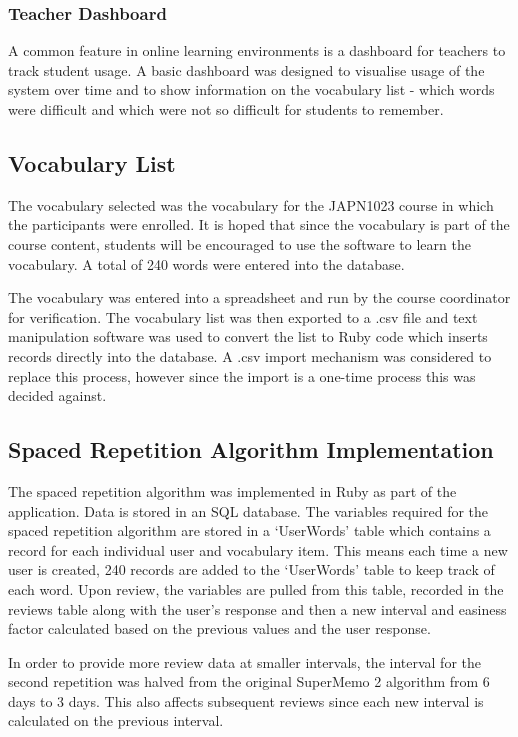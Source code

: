 \subsubsection{Teacher Dashboard}
A common feature in online learning environments is a dashboard for teachers to track
student usage. A basic dashboard was designed to visualise usage of the system
over time and to show information on the vocabulary list - which words were difficult
and which were not so difficult for students to remember.

\subsection{Vocabulary List}
The vocabulary selected was the vocabulary for the JAPN1023 course in which the participants
were enrolled. It is hoped that since the vocabulary is part of the course content, students
will be encouraged to use the software to learn the vocabulary. A total of 240 words were
entered into the database. 

The vocabulary was entered into a spreadsheet and run by the course coordinator for verification.
The vocabulary list was then exported to a .csv file and text manipulation software
was used to convert the list to Ruby code which inserts records directly into the
database. A .csv import mechanism was considered to replace this process, however
since the import is a one-time process this was decided against.  

\subsection{Spaced Repetition Algorithm Implementation}
The spaced repetition algorithm was implemented in Ruby as part of the application.
Data is stored in an SQL database. The variables required for the spaced repetition
algorithm are stored in a `UserWords' table which contains a record for each individual
user and vocabulary item. This means each time a new user is created, 240 records are added to the
`UserWords' table to keep track of each word. Upon review, the variables are pulled from this
table, recorded in
the reviews table along with the user's response 
and then a new interval and easiness factor calculated based on the previous
values and the user response.

In order to provide more review data at smaller intervals, the interval for the second 
repetition was halved from the original SuperMemo 2 algorithm from 6 days to 3 days.
This also affects subsequent reviews since each new interval is calculated on the
previous interval.

